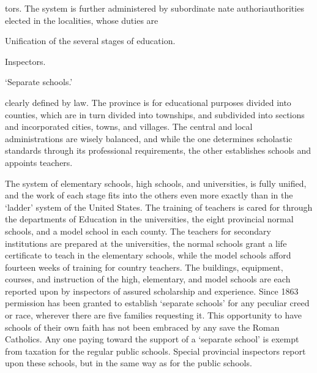 \documentclass[]{book}
\begin{document}
tors. The system is further administered by subordinate nate authoriauthorities elected in the localities, whose duties are

Unification of the several stages of education.

Inspectors.

`Separate schools.'

clearly defined by law. The province is for educational purposes divided into counties, which are in turn divided into townships, and subdivided into sections and incorporated cities, towns, and villages. The central and local administrations are wisely balanced, and while the one determines scholastic standards through its professional requirements, the other establishes schools and appoints teachers.

The system of elementary schools, high schools, and universities, is fully unified, and the work of each stage fits into the others even more exactly than in the `ladder' system of the United States. The training of teachers is cared for through the departments of Education in the universities, the eight provincial normal schools, and a model school in each county. The teachers for secondary institutions are prepared at the universities, the normal schools grant a life certificate to teach in the elementary schools, while the model schools afford fourteen weeks of training for country teachers. The buildings, equipment, courses, and instruction of the high, elementary, and model schools are each reported upon by inspectors of assured scholarship and experience. Since 1863 permission has been granted to establish `separate schools' for any peculiar creed or race, wherever there are five families requesting it. This opportunity to have schools of their own faith has not been embraced by any save the Roman Catholics. Any one paying toward the support of a `separate school' is exempt from taxation for the regular public schools. Special provincial inspectors report upon these schools, but in the same way as for the public schools.
\end{document}
